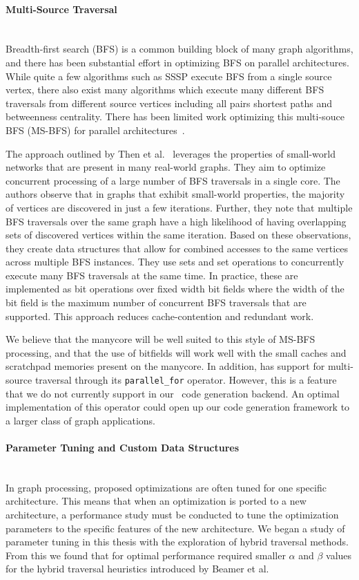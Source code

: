  \paragraph{Multi-Source Traversal}\mbox{}\\
Breadth-first search (BFS) is a common building block of many graph algorithms, and there has been substantial effort in optimizing BFS on parallel architectures. 
While quite a few algorithms such as SSSP execute BFS from a single source vertex, there also exist many algorithms which execute many different BFS traversals from different source vertices including all pairs shortest paths and betweenness centrality.
There has been limited work optimizing this multi-souce BFS (MS-BFS) for parallel architectures~\cite{then2014more, liu2016ibfs}.

The approach outlined by Then et al.~\cite{then2014more} leverages the properties of small-world networks that are present in many real-world graphs.
They aim to optimize concurrent processing of a large number of BFS traversals in a single core.
The authors observe that in graphs that exhibit small-world properties, the majority of vertices are discovered in just a few iterations.
Further, they note that multiple BFS traversals over the same graph have a high likelihood of having overlapping sets of discovered vertices within the same iteration.
Based on these observations, they create data structures that allow for combined accesses to the same vertices across multiple BFS instances.
They use sets and set operations to concurrently execute many BFS traversals at the same time. 
In practice, these are implemented as bit operations over fixed width bit fields where the width of the bit field is the maximum number of concurrent BFS traversals that are supported.
This approach reduces cache-contention and redundant work.

We believe that the manycore will be well suited to this style of MS-BFS processing, and that the use of bitfields will work well with the small caches and scratchpad memories present on the manycore.
In addition, \graphit has support for multi-source traversal through its \lstinline{parallel_for} operator. 
However, this is a feature that we do not currently support in our \hb~code generation backend. 
An optimal implementation of this operator could open up our code generation framework to a larger class of graph applications.

\paragraph{Parameter Tuning and Custom Data Structures}\mbox{}\\
In graph processing, proposed optimizations are often tuned for one specific architecture.
This means that when an optimization is ported to a new architecture, a performance study must be conducted to tune the optimization parameters to the specific features of the new architecture.
We began a study of parameter tuning in this thesis with the exploration of hybrid traversal methods. 
From this we found that for optimal performance \hb required smaller $\alpha$ and $\beta$ values for the hybrid traversal heuristics introduced by Beamer et al.


